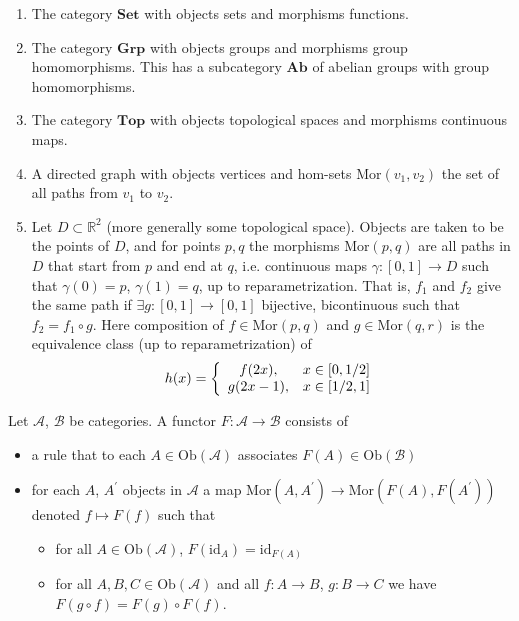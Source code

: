 \begin{xmpl}
\begin{enumerate}
  \item{
    The category $\mathbf{Set}$ with objects sets and morphisms functions.
  }
  \item{
    The category $\mathbf{Grp}$ with objects groups and morphisms
    group homomorphisms. This has a subcategory $\mathbf{Ab}$ of
    abelian groups with group homomorphisms.
  }
  \item{
    The category $\mathbf{Top}$ with objects topological spaces and
    morphisms continuous maps.
  }
  \item{
    A directed graph with objects vertices and hom-sets
    $\mathrm{Mor}(v_1, v_2)$ the set of all paths from $v_1$ to $v_2$.
  }
  \item{
    Let $D \subset \mathbb{R}^2$ (more generally some topological
    space). Objects are taken to be the points of $D$, and for points
    $p, q$ the morphisms $\mathrm{Mor}(p, q)$ are all paths in $D$ that start
    from $p$ and end at $q$, i.e. continuous maps $\gamma : [0,1] \to
    D$ such that $\gamma(0) = p$, $\gamma(1) = q$, up to
    reparametrization. That is, $f_1$ and $f_2$ give the same path if
    $\exists g : [0,1] \to [0,1]$ bijective, bicontinuous such that
    $f_2 = f_1 \circ g$. Here composition of $f \in \mathrm{Mor}(p,q)$
    and $g \in \mathrm{Mor}(q,r)$ is the equivalence class (up to
    reparametrization) of
    $$
    h(x) =
    \left\{\begin{array}{c c}
      f(2x),   & x \in [0, 1/2] \\
      g(2x-1), & x \in [1/2, 1]
    \end{array}\right.
    $$
  }
\end{enumerate}
\end{xmpl}

\begin{defn}[Functors]
Let $\mathscr{A}$, $\mathscr{B}$ be categories. A functor
$F : \mathscr{A} \to \mathscr{B}$ consists of
\begin{itemize}
  \item{
    a rule that to each $A \in \mathrm{Ob}(\mathscr{A})$ associates
    $F(A) \in \mathrm{Ob}(\mathscr{B})$
  }
  \item{
    for each $A$, $A^\prime$ objects in $\mathscr{A}$
    a map $\mathrm{Mor}(A, A^\prime) \to \mathrm{Mor}(F(A),
    F(A^\prime))$ denoted $f \mapsto F(f)$ such that
    \begin{itemize}
      \item{
        for all $A \in \mathrm{Ob}(\mathscr{A})$,
        $F(\mathrm{id}_A) = \mathrm{id}_{F(A)}$
      }
      \item{
        for all $A, B, C \in \mathrm{Ob}(\mathscr{A})$
        and all $f : A \to B$, $g : B \to C$ we have
        $F(g \circ f) = F(g) \circ F(f)$.
      }
    \end{itemize}
  }
\end{itemize}
\end{defn}

